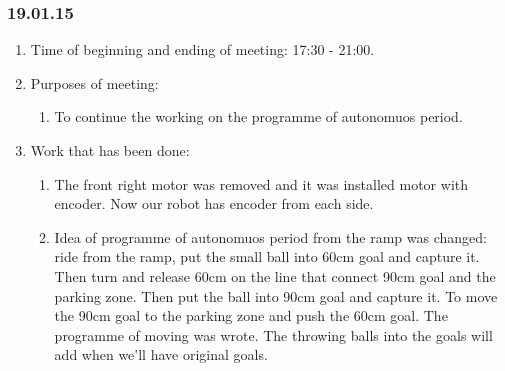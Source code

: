 \subsubsection{19.01.15}
\begin{enumerate}
	
	\item Time of beginning and ending of meeting: 17:30 - 21:00.
	
	\item Purposes of meeting: 
	\begin{enumerate}
		
		\item To continue the working on the programme of autonomuos period.
		
	\end{enumerate}

	\item Work that has been done:
	\begin{enumerate}
		
		\item The front right motor was removed and it was installed motor with encoder. Now our robot has encoder from each side.
		
		\item Idea of programme of autonomuos period from the ramp was changed: ride from the ramp, put the small ball into 60cm goal and capture it. Then turn and release 60cm on the line that connect 90cm goal and the parking zone. Then put the ball into 90cm goal and capture it. To move the 90cm goal to the parking zone and push the 60cm goal. The programme of moving was wrote. The throwing balls into the goals will add when we'll have original goals.
		

\end{enumerate}
\end{enumerate}
